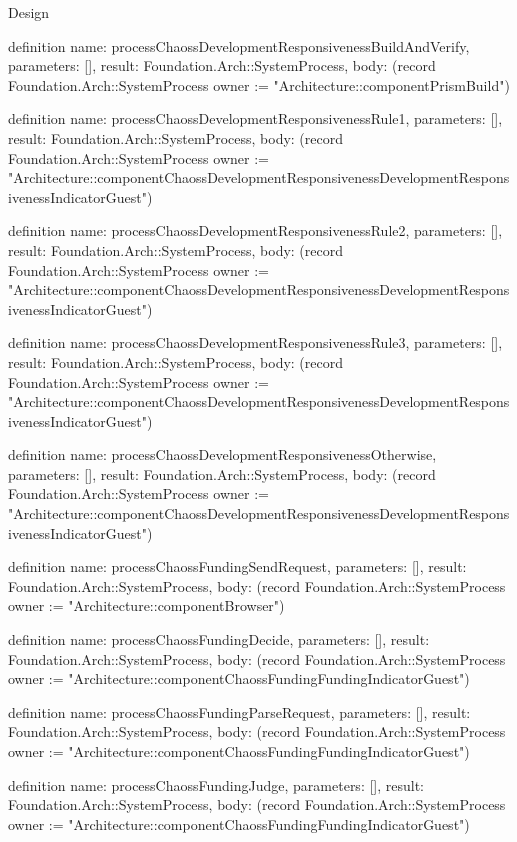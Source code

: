 \begin{lexlean}{Design}
\begin{semanticmodule}
definition{
  name: processChaossDevelopmentResponsivenessBuildAndVerify,
  parameters: [],
  result: Foundation.Arch::SystemProcess,
  body: (record Foundation.Arch::SystemProcess {owner := "Architecture::componentPrismBuild"})
}

definition{
  name: processChaossDevelopmentResponsivenessRule1,
  parameters: [],
  result: Foundation.Arch::SystemProcess,
  body: (record Foundation.Arch::SystemProcess {owner := "Architecture::componentChaossDevelopmentResponsivenessDevelopmentResponsivenessIndicatorGuest"})
}

definition{
  name: processChaossDevelopmentResponsivenessRule2,
  parameters: [],
  result: Foundation.Arch::SystemProcess,
  body: (record Foundation.Arch::SystemProcess {owner := "Architecture::componentChaossDevelopmentResponsivenessDevelopmentResponsivenessIndicatorGuest"})
}

definition{
  name: processChaossDevelopmentResponsivenessRule3,
  parameters: [],
  result: Foundation.Arch::SystemProcess,
  body: (record Foundation.Arch::SystemProcess {owner := "Architecture::componentChaossDevelopmentResponsivenessDevelopmentResponsivenessIndicatorGuest"})
}

definition{
  name: processChaossDevelopmentResponsivenessOtherwise,
  parameters: [],
  result: Foundation.Arch::SystemProcess,
  body: (record Foundation.Arch::SystemProcess {owner := "Architecture::componentChaossDevelopmentResponsivenessDevelopmentResponsivenessIndicatorGuest"})
}

definition{
  name: processChaossFundingSendRequest,
  parameters: [],
  result: Foundation.Arch::SystemProcess,
  body: (record Foundation.Arch::SystemProcess {owner := "Architecture::componentBrowser"})
}

definition{
  name: processChaossFundingDecide,
  parameters: [],
  result: Foundation.Arch::SystemProcess,
  body: (record Foundation.Arch::SystemProcess {owner := "Architecture::componentChaossFundingFundingIndicatorGuest"})
}

definition{
  name: processChaossFundingParseRequest,
  parameters: [],
  result: Foundation.Arch::SystemProcess,
  body: (record Foundation.Arch::SystemProcess {owner := "Architecture::componentChaossFundingFundingIndicatorGuest"})
}

definition{
  name: processChaossFundingJudge,
  parameters: [],
  result: Foundation.Arch::SystemProcess,
  body: (record Foundation.Arch::SystemProcess {owner := "Architecture::componentChaossFundingFundingIndicatorGuest"})
}


\end{semanticmodule}
\end{lexlean}
